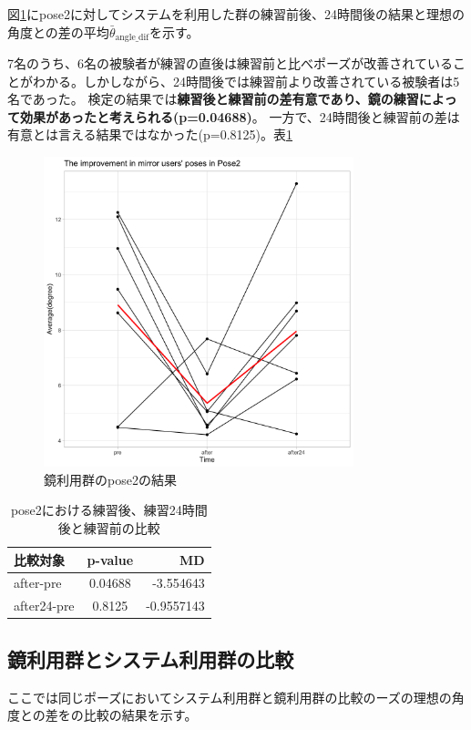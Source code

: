         図\ref{fig:pose2_mirror}にpose2に対してシステムを利用した群の練習前後、24時間後の結果と理想の角度との差の平均\(\bar{\theta}_{\text{angle\_dif}}\)を示す。


      7名のうち、6名の被験者が練習の直後は練習前と比べポーズが改善されていることがわかる。しかしながら、24時間後では練習前より改善されている被験者は5名であった。
      検定の結果では{\bf 練習後と練習前の差有意であり、鏡の練習によって効果があったと考えられる(p=0.04688)}。 一方で、24時間後と練習前の差は有意とは言える結果ではなかった(p=0.8125)。表\ref{table:pose2_mirror_p_value}
      \begin{figure}[H]
        \begin{center}
        \includegraphics[width=9cm]{figures/pose2_system_false_graph.png}
        \caption{鏡利用群のpose2の結果}
        \label{fig:pose2_mirror}
        \end{center}
      \end{figure}

      \begin{table}[ht]
        \centering
        \caption{pose2における練習後、練習24時間後と練習前の比較}
        \begin{tabular}{lcr}
        \hline
        \textbf{比較対象} & \textbf{p-value} & \textbf{MD} \\ \hline
        after-pre & 0.04688 & -3.554643 \\ \hline
        after24-pre & 0.8125 & -0.9557143 \\ \hline
        \end{tabular}
        \label{table:pose2_mirror_p_value}
        \end{table}

  \subsection{鏡利用群とシステム利用群の比較}
    ここでは同じポーズにおいてシステム利用群と鏡利用群の比較のーズの理想の角度との差をの比較の結果を示す。

